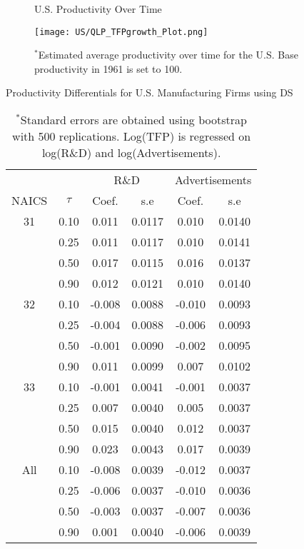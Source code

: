 \documentclass[12pt]{article}
\begin{document}
\begin{appendices}
\begin{figure}[H]
\centering
\caption{U.S. Productivity Over Time}
\texttt{[image: US/QLP\_TFPgrowth\_Plot.png]}
\caption*{\footnotesize $^{*}$Estimated average productivity over time for the U.S. Base productivity in 1961 is set to 100.}
\label{fig:QLPUSTFPG}
\end{figure}

\begin{table}[H]
\centering
\caption{Productivity Differentials for U.S. Manufacturing Firms using DS}
\small
\begin{tabular}{cccccc}
  \hline\hline & & \multicolumn{2}{c}{R\&D}  & \multicolumn{2}{c}{Advertisements} \\ \cmidrule(lr){3-4} \cmidrule(lr){5-6}NAICS & $\tau$ & Coef. & s.e & Coef. & s.e \\ 
  \hline
31 & 0.10 & 0.011 & 0.0117 & 0.010 & 0.0140 \\ 
   & 0.25 & 0.011 & 0.0117 & 0.010 & 0.0141 \\ 
   & 0.50 & 0.017 & 0.0115 & 0.016 & 0.0137 \\ 
   & 0.90 & 0.012 & 0.0121 & 0.010 & 0.0140 \\ 
  32 & 0.10 & -0.008 & 0.0088 & -0.010 & 0.0093 \\ 
   & 0.25 & -0.004 & 0.0088 & -0.006 & 0.0093 \\ 
   & 0.50 & -0.001 & 0.0090 & -0.002 & 0.0095 \\ 
   & 0.90 & 0.011 & 0.0099 & 0.007 & 0.0102 \\ 
  33 & 0.10 & -0.001 & 0.0041 & -0.001 & 0.0037 \\ 
   & 0.25 & 0.007 & 0.0040 & 0.005 & 0.0037 \\ 
   & 0.50 & 0.015 & 0.0040 & 0.012 & 0.0037 \\ 
   & 0.90 & 0.023 & 0.0043 & 0.017 & 0.0039 \\ 
  All & 0.10 & -0.008 & 0.0039 & -0.012 & 0.0037 \\ 
   & 0.25 & -0.006 & 0.0037 & -0.010 & 0.0036 \\ 
   & 0.50 & -0.003 & 0.0037 & -0.007 & 0.0036 \\ 
   & 0.90 & 0.001 & 0.0040 & -0.006 & 0.0039 \\ 
   \hline
\end{tabular}
\caption*{\footnotesize $^{*}$Standard errors are obtained using bootstrap with 500 replications. Log(TFP) is regressed on log(R\&D) and log(Advertisements).}
\label{QLPUSTFPP}
\end{table}


\end{appendices}
\end{document}
